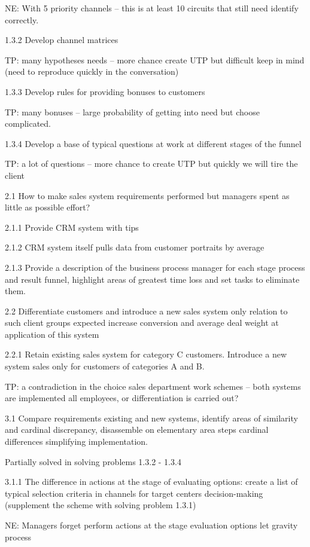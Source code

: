 \documentclass[11pt,a4paper]{book}
\begin{document}
NE: With 5 priority channels -- this is at least 10 circuits that still need
identify correctly.

1.3.2 Develop channel matrices

TP: many hypotheses needs -- more chance create UTP but difficult keep in mind
(need to reproduce quickly in the conversation)

1.3.3 Develop rules for providing bonuses to customers

TP: many bonuses – large probability of getting into need but choose
complicated.

1.3.4 Develop a base of typical questions at work at different stages of the
funnel

TP: a lot of questions -- more chance to create UTP but quickly we will tire
the client

2.1 How to make sales system requirements performed but managers spent as
little as possible effort?

2.1.1 Provide CRM system with tips

2.1.2 CRM system itself pulls data from customer portraits by average

2.1.3 Provide a description of the business process manager for each stage
process and result funnel, highlight areas of greatest time loss and set tasks
to eliminate them.

2.2 Differentiate customers and introduce a new sales system only relation to
such client groups expected increase conversion and average deal weight at
application of this system

2.2.1 Retain existing sales system for category C customers. Introduce a new
system sales only for customers of categories A and B.

TP: a contradiction in the choice sales department work schemes -- both
systems are implemented all employees, or differentiation is carried out?

3.1 Compare requirements existing and new systems, identify areas of
similarity and cardinal discrepancy, disassemble on elementary area steps
cardinal differences simplifying implementation.

Partially solved in solving problems 1.3.2 - 1.3.4

3.1.1 The difference in actions at the stage of evaluating options: create a
list of typical selection criteria in channels for target centers
decision-making (supplement the scheme with solving problem 1.3.1)

NE: Managers forget perform actions at the stage evaluation options let
gravity process
\end{document}
